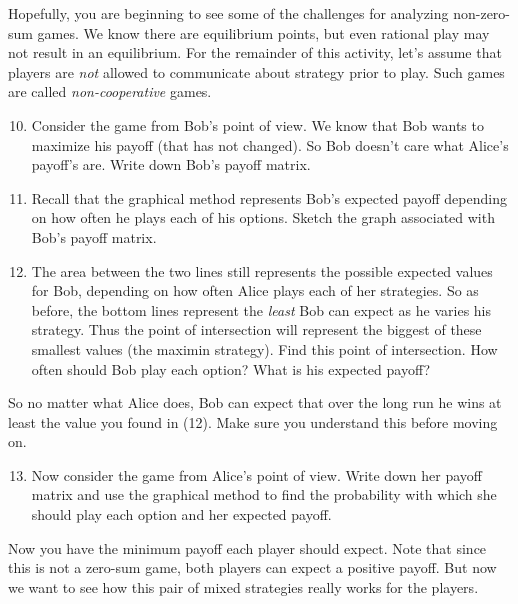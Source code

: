 Hopefully, you are beginning to see some of the challenges for analyzing non-zero-sum games. We know there are equilibrium points, but even rational play may not result in an equilibrium. For the remainder of this activity, let's assume that players are {\it not} allowed to communicate about strategy prior to play.  Such games are called {\it non-cooperative} games.

 \begin{enumerate}
\setcounter{enumi}{9} 
\item Consider the game from Bob's point of view. We know that Bob wants to maximize his payoff (that has not changed). So Bob doesn't care what Alice's payoff's are. Write down Bob's payoff matrix.

\item Recall that the graphical method represents Bob's expected payoff depending on how often he plays each of his options. Sketch the graph associated with Bob's payoff matrix. 

\item  The area between the two lines still represents the possible expected values for Bob, depending on how often Alice plays each of her strategies. So as before, the bottom lines represent the {\it least} Bob can expect as he varies his strategy. Thus the point of intersection will represent the biggest of these smallest values (the maximin strategy). Find this point of intersection. How often should Bob play each option? What is his expected payoff?

\end{enumerate}
So no matter what Alice does, Bob can expect that over the long run he wins at least the value you found in (12). Make sure you understand this before moving on.

\begin{enumerate}
\setcounter{enumi}{12}

\item Now consider the game from Alice's point of view. Write down her payoff matrix and use the graphical method to find the probability with which she should play each option and her expected payoff.
\end{enumerate}

Now you have the minimum payoff each player should expect. Note that since this is not a zero-sum game, both players can expect a positive payoff. But now we want to see how this pair of mixed strategies really works for the players.

